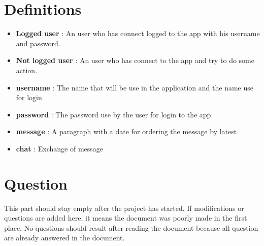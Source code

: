 \documentclass[11pt]{article}
\begin{document}
\section{Definitions}
\begin{itemize}
  \item \textbf{Logged user} : An user who has connect logged to the app with his username and password.
  \item \textbf{Not logged user} : An user who has connect to the app and try to do some action.
  \item \textbf{username} : The name that will be use in the application and the name use for login
  \item \textbf{password} : The password use by the user for login to the app
  \item \textbf{message} : A paragraph with a date for ordering the message by latest
  \item \textbf{chat} : Exchange of message
\end{itemize}

\section{Question}

This part should stay empty after the project has started. If modifications or questions are added here, it means the document was poorly made in the first place. No questions should result after reading the document because all question are already answered in the document.
\end{document}
